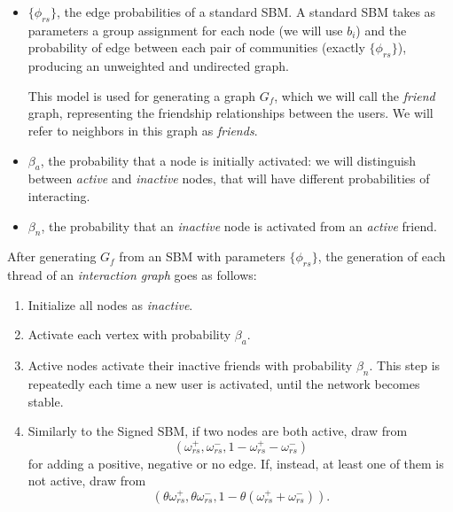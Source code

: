 \begin{itemize}
	\item $\{\phi_{rs} \}$, the edge probabilities of a standard SBM. A standard SBM
	      takes as parameters a group assignment for each node (we will use
	      $b_i$) and the
	      probability of edge between each pair of communities (exactly $\{\phi_{rs} \}$), producing an
	      unweighted and undirected graph.

	      This model is used for generating a graph $G_f$, which we will call the \emph{friend} graph,
	      representing the friendship relationships between the users. We will
	      refer to neighbors in this graph as \emph{friends}.
	\item $\beta _a$, the probability that a node is initially activated: we
	      will distinguish between \emph{active} and \emph{inactive} nodes, that will have
	      different probabilities of interacting.
	\item $\beta _n$, the probability that an \emph{inactive} node is activated
	      from an \emph{active} friend.
\end{itemize}

\bigskip
After generating $G_f$ from an SBM with parameters $\{\phi_{rs} \}$, the
generation of each thread of an \emph{interaction graph} goes as
follows:

\begin{enumerate}
	\item Initialize all nodes as \emph{inactive}.
	\item Activate each vertex with probability $\beta_{a}  $.
	\item Active nodes activate their inactive friends with
	      probability $\beta_n$. This step is repeatedly each time a new user
	      is activated, until the network becomes stable.
	\item Similarly to the Signed SBM, if two nodes are both active, draw
	      from
	      \begin{equation*}
		      (\omega _{rs} ^{+}, \omega _{rs} ^{-}, 1 - \omega _{rs} ^{+} -
		      \omega _{rs} ^{-})
	      \end{equation*}
	      for adding a positive, negative or no edge. If, instead, at least one
	      of them is not active, draw from
	      \begin{equation*}
		      (\theta \omega _{rs} ^{+}, \theta \omega _{rs} ^{-}, 1
		      - \theta (\omega _{rs} ^{+} + \omega _{rs} ^{-})).
	      \end{equation*}
\end{enumerate}


